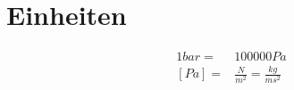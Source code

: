 \section{Einheiten}
\begin{align*}
1 bar =& 100000 Pa \\
\left[Pa\right] =& \frac{N}{m^2} = \frac{kg}{ms^2}
\end{align*}
